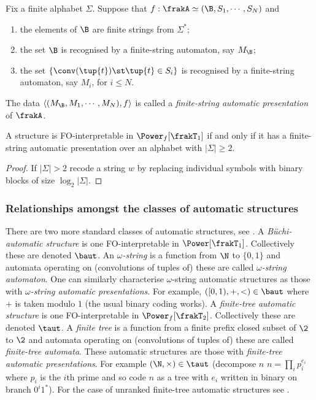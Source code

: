 \begin{definition} \label{AS:dfn:fsap}
Fix a finite alphabet $\Sigma$. Suppose that $f: \frakA \simeq  (\B,S_1,\cdots,S_N)$ and
\begin{enumerate}
\item the elements of $\B$ are finite strings from $\Sigma^\ast$;
\item the set $\B$ is recognised by a finite-string automaton, say $M_\B$; 
\item the set $\{\conv(\tup{t}) \st \tup{t} \in S_i\}$ is recognised by a finite-string automaton, say $M_i$, for $i \leq N$.
\end{enumerate}
The data $\left<(M_\B,M_1,\cdots,M_N), f \right>$ is called a {\em finite-string automatic presentation} of $\frakA$.
\end{definition}

\begin{proposition} \label{AS:prop:MTC}
A structure is FO-interpretable in $\Power_f[\frakT_1]$ if and only if it 
has a finite-string automatic presentation over an alphabet with $|\Sigma| \geq 2$.
\end{proposition}

\begin{proof}
If $|\Sigma| > 2$ recode a string $w$ by replacing individual symbols with binary blocks of size $\log_2 |\Sigma|$.
\end{proof}

\subsubsection*{Relationships amongst the classes of automatic structures}

There are two more standard classes of automatic structures, see \cite{Blum99}.
A {\em B\"uchi-automatic structure} is one FO-interpretable in $\Power[\frakT_1]$. Collectively these are denoted $\baut$. An {\em $\omega$-string} is a function from $\N$ to $\{0,1\}$ and automata operating on (convolutions of tuples of) these are called {\em $\omega$-string automaton}. One can similarly characterise $\omega$-string automatic structures as those with {\em $\omega$-string automatic presentations}. For example, $([0,1),+,<) \in \baut$ where $+$ is taken modulo $1$ (the usual binary coding works).
A {\em finite-tree automatic structure} is one FO-interpretable in $\Power_f[\frakT_2]$. Collectively these are denoted $\taut$. A {\em finite tree} is a function from a finite prefix closed subset of $\2$ to $\2$ and automata operating on (convolutions of tuples of) these are called {\em finite-tree automata}. These automatic structures are those with {\em finite-tree automatic presentations}. For example  $(\N,\times) \in \taut$ (decompose $n$ 
$n=\prod_{i} p_i^{e_i}$ where $p_i$ is the $i$th prime and so code $n$ as a tree with $e_i$ written in binary on
branch $0^i1^\ast$).  For the case of unranked finite-tree automatic structures see \cite{BeLiNe07}.


